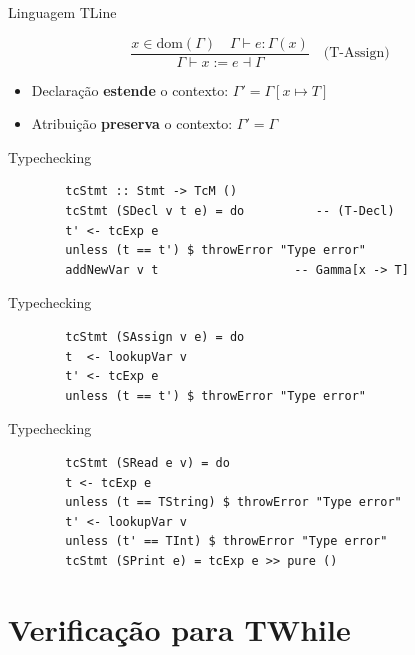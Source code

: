 \begin{frame}{Linguagem TLine}

    \[\frac{x \in \mathrm{dom}(\Gamma) \quad \Gamma \vdash e : \Gamma(x)}{\Gamma \vdash x \mathbin{:=} e \dashv \Gamma} \quad\text{(T-Assign)}\]

    \begin{itemize}

        \item
        Declaração \textbf{estende} o contexto:
        \(\Gamma' = \Gamma[x \mapsto T]\)
        \item
        Atribuição \textbf{preserva} o contexto: \(\Gamma' = \Gamma\)
    \end{itemize}
\end{frame}

\begin{frame}[fragile]{Typechecking}

    \begin{lstlisting}
        tcStmt :: Stmt -> TcM ()
        tcStmt (SDecl v t e) = do          -- (T-Decl)
        t' <- tcExp e
        unless (t == t') $ throwError "Type error"
        addNewVar v t                   -- Gamma[x -> T]
    \end{lstlisting}
\end{frame}

\begin{frame}[fragile]{Typechecking}

    \begin{lstlisting}
        tcStmt (SAssign v e) = do
        t  <- lookupVar v
        t' <- tcExp e
        unless (t == t') $ throwError "Type error"
    \end{lstlisting}
\end{frame}

\begin{frame}[fragile]{Typechecking}

    \begin{lstlisting}
        tcStmt (SRead e v) = do
        t <- tcExp e
        unless (t == TString) $ throwError "Type error"
        t' <- lookupVar v
        unless (t' == TInt) $ throwError "Type error"
        tcStmt (SPrint e) = tcExp e >> pure ()
    \end{lstlisting}
\end{frame}


\section{Verificação para TWhile}\label{verificauxe7uxe3o-para-twhile}

